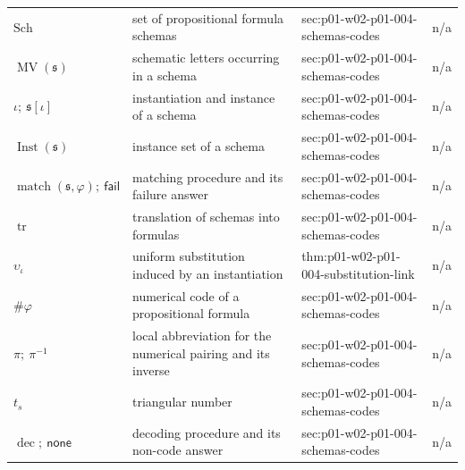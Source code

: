 \begin{longtable}{@{}p{}p{}p{}p{}@{}}
\(\mathrm{Sch}\) & set of propositional formula schemas & sec:\allowbreak{}p01-\allowbreak{}w02-\allowbreak{}p01-\allowbreak{}004-\allowbreak{}schemas-\allowbreak{}codes & n/a \\
\(\operatorname{MV}(\mathfrak s)\) & schematic letters occurring in a schema & sec:\allowbreak{}p01-\allowbreak{}w02-\allowbreak{}p01-\allowbreak{}004-\allowbreak{}schemas-\allowbreak{}codes & n/a \\
\(\iota;\allowbreak \ \mathfrak s[\iota]\) & instantiation and instance of a schema & sec:\allowbreak{}p01-\allowbreak{}w02-\allowbreak{}p01-\allowbreak{}004-\allowbreak{}schemas-\allowbreak{}codes & n/a \\
\(\operatorname{Inst}(\mathfrak s)\) & instance set of a schema & sec:\allowbreak{}p01-\allowbreak{}w02-\allowbreak{}p01-\allowbreak{}004-\allowbreak{}schemas-\allowbreak{}codes & n/a \\
\(\operatorname{match}(\mathfrak s,\allowbreak \varphi);\allowbreak \ \mathsf{fail}\) & matching procedure and its failure answer & sec:\allowbreak{}p01-\allowbreak{}w02-\allowbreak{}p01-\allowbreak{}004-\allowbreak{}schemas-\allowbreak{}codes & n/a \\
\(\operatorname{tr}\) & translation of schemas into formulas & sec:\allowbreak{}p01-\allowbreak{}w02-\allowbreak{}p01-\allowbreak{}004-\allowbreak{}schemas-\allowbreak{}codes & n/a \\
\(\upsilon_\iota\) & uniform substitution induced by an instantiation & thm:\allowbreak{}p01-\allowbreak{}w02-\allowbreak{}p01-\allowbreak{}004-\allowbreak{}substitution-\allowbreak{}link & n/a \\
\(\#\varphi\) & numerical code of a propositional formula & sec:\allowbreak{}p01-\allowbreak{}w02-\allowbreak{}p01-\allowbreak{}004-\allowbreak{}schemas-\allowbreak{}codes & n/a \\
\(\pi;\allowbreak \ \pi^{-1}\) & local abbreviation for the numerical pairing and its inverse & sec:\allowbreak{}p01-\allowbreak{}w02-\allowbreak{}p01-\allowbreak{}004-\allowbreak{}schemas-\allowbreak{}codes & n/a \\
\(t_s\) & triangular number & sec:\allowbreak{}p01-\allowbreak{}w02-\allowbreak{}p01-\allowbreak{}004-\allowbreak{}schemas-\allowbreak{}codes & n/a \\
\(\operatorname{dec};\allowbreak \ \mathsf{none}\) & decoding procedure and its non-code answer & sec:\allowbreak{}p01-\allowbreak{}w02-\allowbreak{}p01-\allowbreak{}004-\allowbreak{}schemas-\allowbreak{}codes & n/a \\

\end{longtable}

